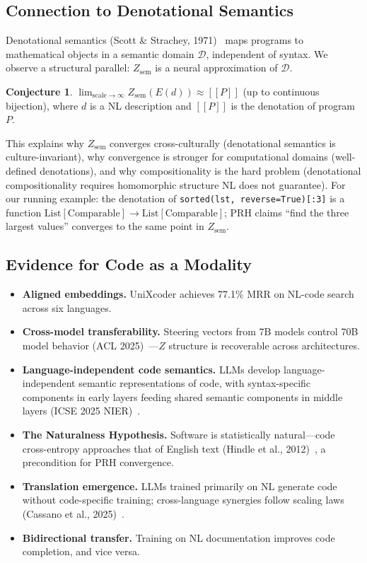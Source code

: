 \documentclass{article}
\theoremstyle{definition}
\newtheorem{conjecture}{Conjecture}[section]
\newcommand{\Zsem}{Z_{\text{sem}}}
\begin{document}
\subsection{Connection to Denotational Semantics}

Denotational semantics (Scott \& Strachey, 1971)~\citep{scott1971semantics} maps programs to mathematical objects in a semantic domain $\mathcal{D}$, independent of syntax. We observe a structural parallel: $\Zsem$ is a neural approximation of $\mathcal{D}$.

\begin{conjecture}\label{conj:denotational}
$\lim_{\text{scale}\to\infty} \Zsem(E(d)) \approx [\![ P ]\!]$ (up to continuous bijection), where $d$ is a NL description and $[\![ P ]\!]$ is the denotation of program $P$.
\end{conjecture}

This explains why $\Zsem$ converges cross-culturally (denotational semantics is culture-invariant), why convergence is stronger for computational domains (well-defined denotations), and why compositionality is the hard problem (denotational compositionality requires homomorphic structure NL does not guarantee). For our running example: the denotation of \texttt{sorted(lst, reverse=True)[:3]} is a function $\text{List}[\text{Comparable}] \to \text{List}[\text{Comparable}]$; PRH claims ``find the three largest values'' converges to the same point in $\Zsem$.

\subsection{Evidence for Code as a Modality}\label{sec:evidence}

\begin{itemize}[nosep]
  \item \textbf{Aligned embeddings.} UniXcoder achieves 77.1\% MRR on NL-code search across six languages.
  \item \textbf{Cross-model transferability.} Steering vectors from 7B models control 70B model behavior (ACL 2025)~\citep{chen2025crossmodel}---$Z$ structure is recoverable across architectures.
  \item \textbf{Language-independent code semantics.} LLMs develop language-independent semantic representations of code, with syntax-specific components in early layers feeding shared semantic components in middle layers (ICSE 2025 NIER)~\citep{beyondsyntax2025}.
  \item \textbf{The Naturalness Hypothesis.} Software is statistically natural---code cross-entropy approaches that of English text (Hindle et al., 2012)~\citep{hindle2012naturalness}, a precondition for PRH convergence.
  \item \textbf{Translation emergence.} LLMs trained primarily on NL generate code without code-specific training; cross-language synergies follow scaling laws (Cassano et al., 2025)~\citep{cassano2025scaling}.
  \item \textbf{Bidirectional transfer.} Training on NL documentation improves code completion, and vice versa.
\end{itemize}
\end{document}
